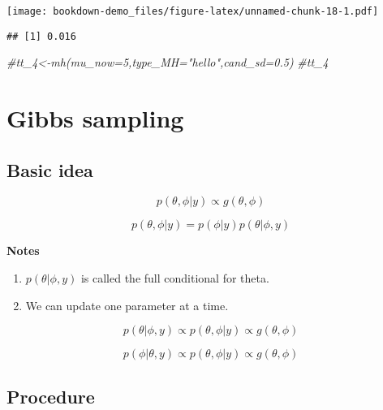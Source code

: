 \documentclass[]{book}
\newenvironment{Shaded}{\begin{snugshade}}{\end{snugshade}}
\newcommand{\CommentTok}[1]{\textcolor[rgb]{0.56,0.35,0.01}{\textit{#1}}}
\newcommand{\DecValTok}[1]{\textcolor[rgb]{0.00,0.00,0.81}{#1}}
\newcommand{\NormalTok}[1]{#1}
\newcommand{\OperatorTok}[1]{\textcolor[rgb]{0.81,0.36,0.00}{\textbf{#1}}}
\begin{document}
\texttt{[image: bookdown-demo\_files/figure-latex/unnamed-chunk-18-1.pdf]}

\begin{Shaded}
\end{Shaded}

\begin{verbatim}
## [1] 0.016
\end{verbatim}

\begin{Shaded}
\begin{Highlighting}[]
\CommentTok{#tt_4<-mh(mu_now=5,type_MH="hello",cand_sd=0.5)}
\CommentTok{#tt_4}
\end{Highlighting}
\end{Shaded}

\hypertarget{gibbs-sampling}{%
\section{Gibbs sampling}\label{gibbs-sampling}}

\hypertarget{basic-idea}{%
\subsection{Basic idea}\label{basic-idea}}

\[p(\theta, \phi|y) \propto g(\theta, \phi)\]

\[p(\theta, \phi|y) = p(\phi |y)p(\theta| \phi,y)\]

\textbf{Notes}

\begin{enumerate}
\def\labelenumi{(\arabic{enumi})}
\item
  \(p(\theta| \phi,y)\) is called the full conditional for theta.
\item
  We can update one parameter at a time.
\end{enumerate}

\[p(\theta| \phi,y) \propto p(\theta, \phi|y) \propto g(\theta, \phi)\]

\[p(\phi| \theta,y) \propto p(\theta, \phi|y) \propto g(\theta, \phi)\]

\hypertarget{procedure-1}{%
\subsection{Procedure}\label{procedure-1}}
\end{document}
